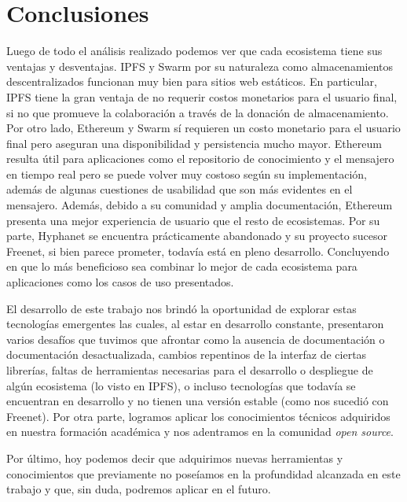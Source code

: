 \section{Conclusiones}

Luego de todo el análisis realizado podemos ver que cada ecosistema tiene sus ventajas y desventajas. IPFS y Swarm por su naturaleza como almacenamientos descentralizados funcionan muy bien para sitios web estáticos. En particular, IPFS tiene la gran ventaja de no requerir costos monetarios para el usuario final, si no que promueve la colaboración a través de la donación de almacenamiento. Por otro lado, Ethereum y Swarm sí requieren un costo monetario para el usuario final pero aseguran una disponibilidad y persistencia mucho mayor. Ethereum resulta útil para aplicaciones como el repositorio de conocimiento y el mensajero en tiempo real pero se puede volver muy costoso según su implementación, además de algunas cuestiones de usabilidad que son más evidentes en el mensajero. Además, debido a su comunidad y amplia documentación, Ethereum presenta una mejor experiencia de usuario que el resto de ecosistemas. Por su parte, Hyphanet se encuentra prácticamente abandonado y su proyecto sucesor Freenet, si bien parece prometer, todavía está en pleno desarrollo. Concluyendo en que lo más beneficioso sea combinar lo mejor de cada ecosistema para aplicaciones como los casos de uso presentados.

El desarrollo de este trabajo nos brindó la oportunidad de explorar estas tecnologías emergentes las cuales, al estar en desarrollo constante, presentaron varios desafíos que tuvimos que afrontar como la ausencia de documentación o documentación desactualizada, cambios repentinos de la interfaz de ciertas librerías, faltas de herramientas necesarias para el desarrollo o despliegue de algún ecosistema (lo visto en IPFS), o incluso tecnologías que todavía se encuentran en desarrollo y no tienen una versión estable (como nos sucedió con Freenet). Por otra parte, logramos aplicar los conocimientos técnicos adquiridos en nuestra formación académica y nos adentramos en la comunidad \textit{open source}.

Por último, hoy podemos decir que adquirimos nuevas herramientas y conocimientos que previamente no poseíamos en la profundidad alcanzada en este trabajo y que, sin duda, podremos aplicar en el futuro.
